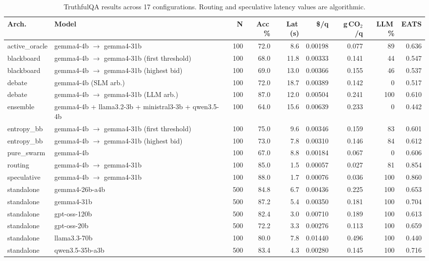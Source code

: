 \begin{table}[htbp]
\centering
\caption{TruthfulQA results across 17 configurations. Routing and speculative latency values are algorithmic.}
\label{tab:result-truthfulqa}
\scriptsize
\renewcommand{\arraystretch}{1.15}
\begin{tabularx}{\linewidth}{@{} l X r r r r r r r @{}}
\toprule
\textbf{Arch.} & \textbf{Model} & \textbf{N} & \textbf{Acc\,\%} & \textbf{Lat\,(s)} & \textbf{\$/q} & \textbf{g\,CO$_2$/q} & \textbf{LLM\,\%} & \textbf{EATS} \\
\midrule
active\_oracle & gemma4-4b $\rightarrow$ gemma4-31b & 100 & 72.0 & 8.6 & 0.00198 & 0.077 & 89 & 0.636 \\
blackboard & gemma4-4b $\rightarrow$ gemma4-31b (first threshold) & 100 & 68.0 & 11.8 & 0.00333 & 0.141 & 44 & 0.547 \\
blackboard & gemma4-4b $\rightarrow$ gemma4-31b (highest bid) & 100 & 69.0 & 13.0 & 0.00366 & 0.155 & 46 & 0.537 \\
debate & gemma4-4b (SLM arb.) & 100 & 72.0 & 18.7 & 0.00389 & 0.142 & 0 & 0.517 \\
debate & gemma4-4b $\rightarrow$ gemma4-31b (LLM arb.) & 100 & 87.0 & 12.0 & 0.00504 & 0.241 & 100 & 0.610 \\
ensemble & gemma4-4b + llama3.2-3b + ministral3-3b + qwen3.5-4b & 100 & 64.0 & 15.6 & 0.00639 & 0.233 & 0 & 0.442 \\
entropy\_bb & gemma4-4b $\rightarrow$ gemma4-31b (first threshold) & 100 & 75.0 & 9.6 & 0.00346 & 0.159 & 83 & 0.601 \\
entropy\_bb & gemma4-4b $\rightarrow$ gemma4-31b (highest bid) & 100 & 73.0 & 7.8 & 0.00310 & 0.146 & 84 & 0.612 \\
pure\_swarm & gemma4-4b & 100 & 67.0 & 8.8 & 0.00184 & 0.067 & 0 & 0.606 \\
routing & gemma4-4b $\rightarrow$ gemma4-31b & 100 & 85.0 & 1.5 & 0.00057 & 0.027 & 81 & 0.854 \\
speculative & gemma4-4b $\rightarrow$ gemma4-31b & 100 & 88.0 & 1.7 & 0.00076 & 0.036 & 100 & 0.860 \\
standalone & gemma4-26b-a4b & 500 & 84.8 & 6.7 & 0.00436 & 0.225 & 100 & 0.653 \\
standalone & gemma4-31b & 500 & 87.2 & 5.4 & 0.00350 & 0.181 & 100 & 0.704 \\
standalone & gpt-oss-120b & 500 & 82.4 & 3.0 & 0.00710 & 0.189 & 100 & 0.613 \\
standalone & gpt-oss-20b & 500 & 72.2 & 3.3 & 0.00276 & 0.113 & 100 & 0.659 \\
standalone & llama3.3-70b & 100 & 80.0 & 7.8 & 0.01440 & 0.496 & 100 & 0.440 \\
standalone & qwen3.5-35b-a3b & 500 & 83.4 & 4.3 & 0.00280 & 0.145 & 100 & 0.716 \\
\bottomrule
\end{tabularx}
\end{table}

